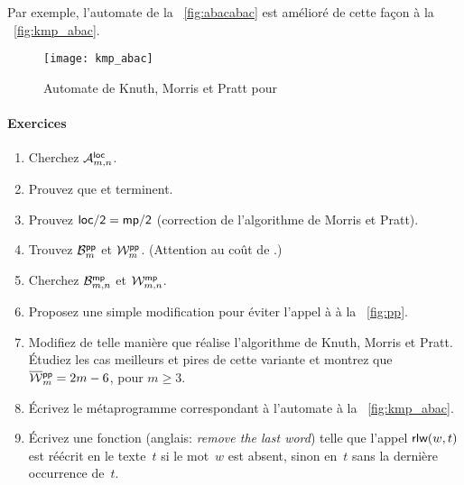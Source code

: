 Par exemple, l'automate de la \fig~\vref{fig:abacabac} est amélioré de
cette façon à la \fig~\vref{fig:kmp_abac}.
\begin{figure}
\centering
\texttt{[image: kmp\_abac]}
\caption{Automate de Knuth, Morris et Pratt pour }
\label{fig:kmp_abac}
\end{figure}

\paragraph{Exercices}

\begin{enumerate}

  \item Cherchez \(\M{\fun{loc}}{m,n}\).

  \item Prouvez que  et  terminent.

  \item Prouvez \(\fun{loc/2} = \fun{mp/2}\) (correction de
    l'algorithme de Morris et Pratt).

  \item Trouvez \(\B{\fun{pp}}{m}\) et \(\W{\fun{pp}}{m}\). (Attention
    au coût de .)

  \item Cherchez \(\B{\fun{mp}}{m,n}\) et \(\W{\fun{mp}}{m,n}\).

  \item Proposez une simple modification pour éviter l'appel à
     à la \fig~\vref{fig:pp}.\label{factoring_trick}

  \item Modifiez  de telle manière que  réalise
    l'algorithme de Knuth, Morris et Pratt. Étudiez les cas meilleurs
    et pires de cette variante et montrez que \(\OW{\fun{pp}}{m} =
    2m-6\), pour \(m \geqslant 3\).

  \item Écrivez le métaprogramme correspondant à l'automate à la
    \fig~\vref{fig:kmp_abac}.

  \item Écrivez une fonction 
    (anglais: \emph{remove the last word}) telle que l'appel
    \(\fun{rlw}(w,t)\) est réécrit en le texte~\(t\) si le mot~\(w\)
    est absent, sinon en~\(t\) sans la dernière occurrence de~\(t\).

\end{enumerate}
